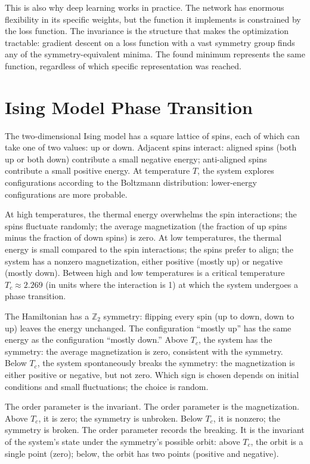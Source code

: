 This is also why deep learning works in practice. The network has
enormous flexibility in its specific weights, but the function it
implements is constrained by the loss function. The invariance is
the structure that makes the optimization tractable: gradient
descent on a loss function with a vast symmetry group finds any
of the symmetry-equivalent minima. The found minimum represents
the same function, regardless of which specific representation
was reached.

\section{Ising Model Phase Transition}
\label{se:ising-model-phase-transition}

The two-dimensional Ising model has a square lattice of spins, each
of which can take one of two values: up or down. Adjacent spins
interact: aligned spins (both up or both down) contribute a small
negative energy; anti-aligned spins contribute a small positive
energy. At temperature $T$, the system explores configurations
according to the Boltzmann distribution: lower-energy configurations
are more probable.

At high temperatures, the thermal energy overwhelms the spin
interactions; the spins fluctuate randomly; the average
magnetization (the fraction of up spins minus the fraction of down
spins) is zero. At low temperatures, the thermal energy is small
compared to the spin interactions; the spins prefer to align; the
system has a nonzero magnetization, either positive (mostly up) or
negative (mostly down). Between high and low temperatures is a
critical temperature $T_c \approx 2.269$ (in units where the
interaction is 1) at which the system undergoes a phase transition.

The Hamiltonian has a $\mathbb{Z}_2$ symmetry: flipping every spin
(up to down, down to up) leaves the energy unchanged. The
configuration ``mostly up'' has the same energy as the configuration
``mostly down.'' Above $T_c$, the system has the symmetry: the
average magnetization is zero, consistent with the symmetry. Below
$T_c$, the system spontaneously breaks the symmetry: the magnetization
is either positive or negative, but not zero. Which sign is chosen
depends on initial conditions and small fluctuations; the choice is
random.

The order parameter is the invariant. The order parameter is the
magnetization. Above $T_c$, it is zero; the symmetry is unbroken.
Below $T_c$, it is nonzero; the symmetry is broken. The order
parameter records the breaking. It is the invariant of the system's
state under the symmetry's possible orbit: above $T_c$, the orbit
is a single point (zero); below, the orbit has two points (positive
and negative).

